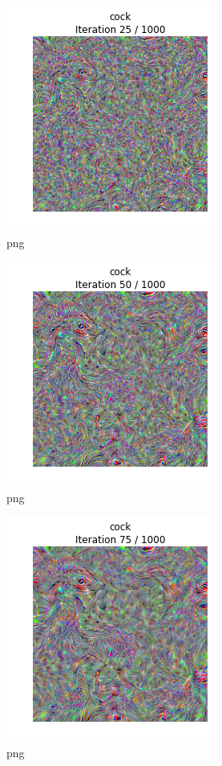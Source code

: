 \documentclass[]{book}
\theoremstyle{definition}
\theoremstyle{definition}
\theoremstyle{definition}
\theoremstyle{remark}
\begin{document}
\begin{figure}
\centering
\includegraphics{Network-Visualization-TensorFlow_files/Network-Visualization-TensorFlow_22_1.png}
\caption{png}
\end{figure}

\begin{figure}
\centering
\includegraphics{Network-Visualization-TensorFlow_files/Network-Visualization-TensorFlow_22_2.png}
\caption{png}
\end{figure}

\begin{figure}
\centering
\includegraphics{Network-Visualization-TensorFlow_files/Network-Visualization-TensorFlow_22_3.png}
\caption{png}
\end{figure}
\end{document}
